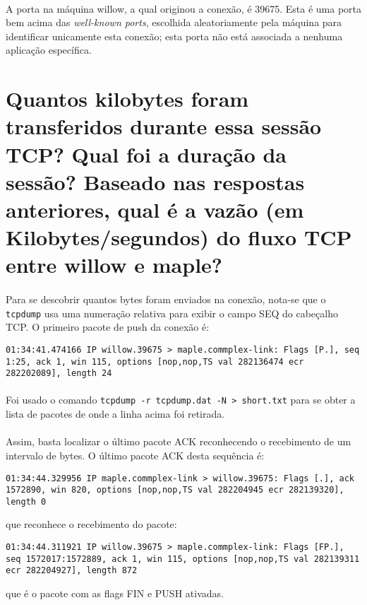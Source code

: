 \documentclass[a4paper,10pt,oneside,final,titlepage,onecolumn]{article}
\begin{document}
\paragraph{}A porta na máquina willow, a qual originou a conexão, é 39675. Esta é uma porta bem acima das \emph{well-known ports}, escolhida aleatoriamente pela máquina para identificar unicamente esta conexão; esta porta não está associada a nenhuma aplicação específica.



\section{Quantos kilobytes foram transferidos durante essa sessão TCP? Qual foi a duração da sessão? Baseado nas respostas anteriores, qual é a vazão (em Kilobytes/segundos) do fluxo TCP entre willow e maple?}
\paragraph{}Para se descobrir quantos bytes foram enviados na conexão, nota-se que o \verb|tcpdump| usa uma numeração relativa para exibir o campo SEQ do cabeçalho TCP. O primeiro pacote de push da conexão é:
\begin{lstlisting}
01:34:41.474166 IP willow.39675 > maple.commplex-link: Flags [P.], seq 1:25, ack 1, win 115, options [nop,nop,TS val 282136474 ecr 282202089], length 24
\end{lstlisting}
\paragraph{}Foi usado o comando \verb|tcpdump -r tcpdump.dat -N > short.txt| para se obter a lista de pacotes de onde a linha acima foi retirada.
\paragraph{}Assim, basta localizar o último pacote ACK reconhecendo o recebimento de um intervalo de bytes. O último pacote ACK desta sequência é:
\begin{lstlisting}
01:34:44.329956 IP maple.commplex-link > willow.39675: Flags [.], ack 1572890, win 820, options [nop,nop,TS val 282204945 ecr 282139320], length 0
\end{lstlisting}
que reconhece o recebimento do pacote:
\begin{lstlisting}
01:34:44.311921 IP willow.39675 > maple.commplex-link: Flags [FP.], seq 1572017:1572889, ack 1, win 115, options [nop,nop,TS val 282139311 ecr 282204927], length 872
\end{lstlisting}
que é o pacote com as flags FIN e PUSH ativadas.
\end{document}

